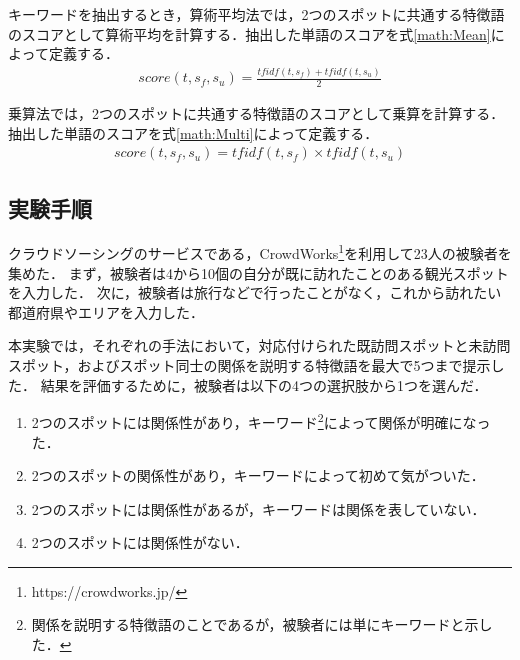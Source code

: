 \documentclass[submit]{ipsj}
\begin{document}

キーワードを抽出するとき，算術平均法では，2つのスポットに共通する特徴語のスコアとして算術平均を計算する．抽出した単語のスコアを式\ref{math:Mean}によって定義する．
\begin{eqnarray}
  score(t,s_f,s_u) = \frac{tfidf(t,s_f) + tfidf(t,s_u)}{2}
  \label{math:Mean}
\end{eqnarray}

乗算法では，2つのスポットに共通する特徴語のスコアとして乗算を計算する．抽出した単語のスコアを式\ref{math:Multi}によって定義する．
\begin{eqnarray}
  score(t,s_f,s_u) = tfidf(t,s_f) \times tfidf(t,s_u)
  \label{math:Multi}
\end{eqnarray}


\subsection{実験手順}
\label{subsec:実験手順}
クラウドソーシングのサービスである，CrowdWorks\footnote{https://crowdworks.jp/}を利用して23人の被験者を集めた．
まず，被験者は4から10個の自分が既に訪れたことのある観光スポットを入力した．
次に，被験者は旅行などで行ったことがなく，これから訪れたい都道府県やエリアを入力した．

本実験では，それぞれの手法において，対応付けられた既訪問スポットと未訪問スポット，およびスポット同士の関係を説明する特徴語を最大で5つまで提示した．
結果を評価するために，被験者は以下の4つの選択肢から1つを選んだ．
\begin{enumerate}
  \item 2つのスポットには関係性があり，キーワード\footnote{関係を説明する特徴語のことであるが，被験者には単にキーワードと示した．}によって関係が明確になった．
  \item 2つのスポットの関係性があり，キーワードによって初めて気がついた．
  \item 2つのスポットには関係性があるが，キーワードは関係を表していない．
  \item 2つのスポットには関係性がない．
\end{enumerate}
\end{document}
